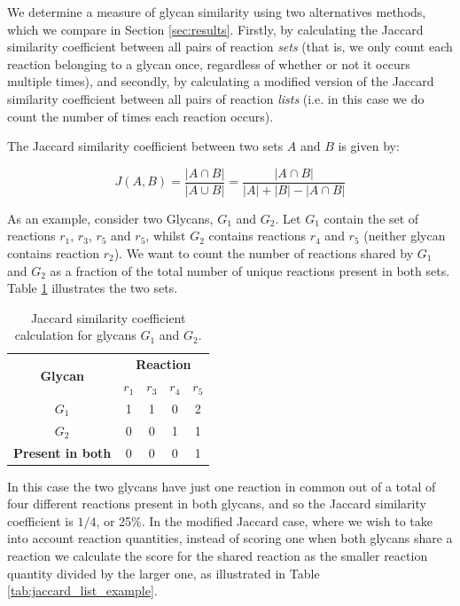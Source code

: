 \documentclass[12pt,a4paper]{article}
\begin{document}
We determine a measure of glycan similarity using two alternatives methods, which we compare in Section \ref{sec:results}. Firstly, by calculating the Jaccard similarity coefficient between all pairs of reaction \emph{sets} (that is, we only count each reaction belonging to a glycan once, regardless of whether or not it occurs multiple times), and secondly, by calculating a modified version of the Jaccard similarity coefficient between all pairs of reaction \emph{lists} (i.e. in this case we do count the number of times each reaction occurs).

The Jaccard similarity coefficient between two sets $A$ and $B$ is given by:

\begin{equation}
\label{eq:precall}
	J(A,B)=\frac{|A \cap B|}{|A \cup B|}=\frac{|A \cap B|}{|A|+|B|-|A \cap B|}
\end{equation}

As an example, consider two Glycans, $G_1$ and $G_2$. Let $G_1$ contain the set of reactions $r_1$, $r_3$, $r_5$ and $r_5$, whilst $G_2$ contains reactions $r_4$ and $r_5$ (neither glycan contains reaction $r_2$). We want to count the number of reactions shared by $G_1$ and $G_2$ as a fraction of the total number of unique reactions present in both sets. Table \ref{tab:jaccard_set_example} illustrates the two sets.\\

\begin{table}[h]
\centering
\begin{tabular}{|c|c|c|c|c|} \hline
\multirow{2}{*}{\bf Glycan} & \multicolumn{4}{|c|}{\bf Reaction}\\  \cline{2-5}
& {\bf $r_1$} & {\bf $r_3$} & {\bf $r_4$} & {\bf $r_5$} \\ \hline
$G_1$ & 1 & 1 & 0 & 2 \\ \hline
$G_2$ & 0 & 0 & 1 & 1 \\ \hline
{\bf Present in both} & 0 & 0 & 0 & 1 \\ \hline
\end{tabular}
\caption{Jaccard similarity coefficient calculation for glycans $G_1$ and $G_2$.}
\label{tab:jaccard_set_example}
\end{table}

In this case the two glycans have just one reaction in common out of a total of four different reactions present in both glycans, and so the Jaccard similarity coefficient is $1/4$, or 25\%. In the modified Jaccard case, where we wish to take into account reaction quantities, instead of scoring one when both glycans share a reaction we calculate the score for the shared reaction as the smaller reaction quantity divided by the larger one, as illustrated in Table \ref{tab:jaccard_list_example}.\\
\end{document}

